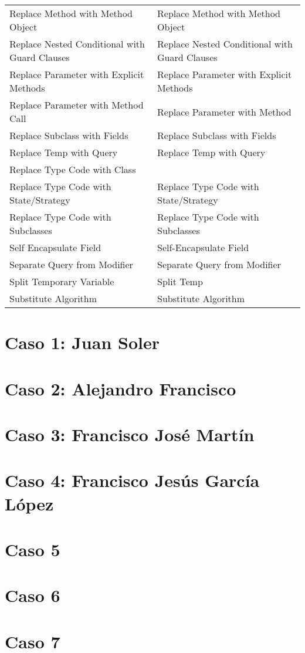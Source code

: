 \documentclass[11pt,a4paper,oneside]{book}
\begin{document}
\begin{longtable}{|p{200pt}|p{200pt}|}
    Replace Method with Method Object & Replace Method with Method Object\\ 
    Replace Nested Conditional with Guard Clauses & Replace Nested Conditional with Guard Clauses\\ 
    Replace Parameter with Explicit Methods & Replace Parameter with Explicit Methods\\ 
    Replace Parameter with Method Call & Replace Parameter with Method\\ 
    Replace Subclass with Fields & Replace Subclass with Fields\\ 
    Replace Temp with Query & Replace Temp with Query\\ 
    Replace Type Code with Class & \\ 
    Replace Type Code with State/Strategy & Replace Type Code with State/Strategy\\ 
    Replace Type Code with Subclasses & Replace Type Code with Subclasses\\ 
    Self Encapsulate Field & Self-Encapsulate Field\\ 
    Separate Query from Modifier & Separate Query from Modifier\\ 
    Split Temporary Variable & Split Temp\\ 
    Substitute Algorithm &     Substitute Algorithm\\
\end{longtable}





\chapter{Caso 1: Juan Soler}

\chapter{Caso 2: Alejandro Francisco}

\chapter {Caso 3: Francisco José Martín}



\chapter {Caso 4: Francisco Jesús García López}



\chapter {Caso 5}


\chapter {Caso 6}


\chapter {Caso 7}
\end{document}
